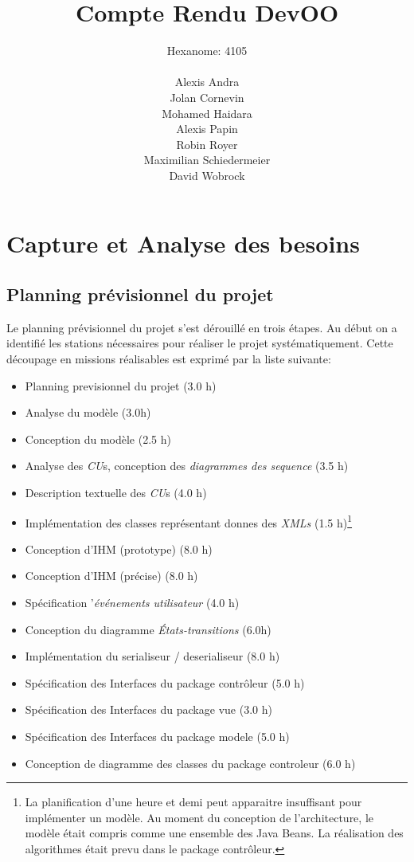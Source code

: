 \documentclass[10pt,a4paper]{book}
\author{Hexanome: 4105\\\\Alexis Andra\\Jolan Cornevin\\Mohamed Haidara\\Alexis Papin\\Robin Royer\\Maximilian Schiedermeier\\David Wobrock}
\title{Compte Rendu DevOO}
\begin{document}
\maketitle
\tableofcontents 
\chapter{Capture et Analyse des besoins}
\section{Planning prévisionnel du projet}
Le planning prévisionnel du projet s'est dérouillé en trois étapes. Au début on a identifié les stations nécessaires pour réaliser le projet systématiquement. Cette découpage en missions réalisables est exprimé par la liste suivante:
\begin{itemize}
	\item{Planning previsionnel du projet (3.0 h)}
	\item{Analyse du modèle (3.0h)}
	\item{Conception du modèle (2.5 h)}
	\item{Analyse des \textit{CU}s, conception des \textit{diagrammes des sequence} (3.5 h)}
	\item{Description textuelle des \textit{CU}s (4.0 h)}
	\item{Implémentation des classes représentant donnes des \textit{XMLs} (1.5 h)\footnote{La planification d'une heure et demi peut apparaitre insuffisant pour implémenter un modèle. Au moment du conception de l'architecture, le modèle était compris comme une ensemble des Java Beans. La réalisation des algorithmes était prevu dans le package contrôleur.}}
	\item{Conception d'IHM (prototype) (8.0 h)}
	\item{Conception d'IHM (précise) (8.0 h)}
	\item{Spécification '\textit{événements utilisateur} (4.0 h)}
	\item{Conception du diagramme \textit{États-transitions} (6.0h)}
	\item{Implémentation du serialiseur / deserialiseur (8.0 h)}
	\item{Spécification des Interfaces du package contrôleur (5.0 h)}
	\item{Spécification des Interfaces du package vue (3.0 h)}
	\item{Spécification des Interfaces du package modele (5.0 h)}
	\item{Conception de diagramme des classes du package controleur (6.0 h)}

\end{itemize}
\end{document}
